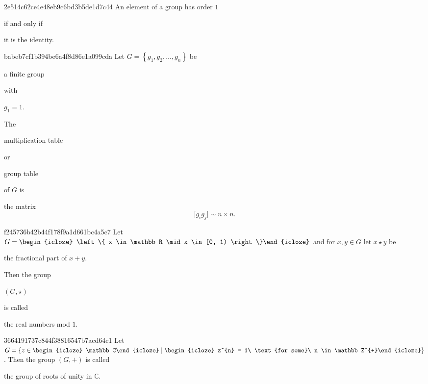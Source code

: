 \begin{note}{2e514c62ce4e48eb9c6bd3b5de1d7c44}
    An element of a group has order \({ 1 }\) \begin{icloze}{2}if and only if\end{icloze} \begin{icloze}{1}it is the identity.\end{icloze}
\end{note}

\begin{note}{babeb7cf1b394be6a4f8d86e1a099cda}
    Let \({ G = \left\{ g_1, g_2, \ldots, g_n \right\} }\) be \begin{icloze}{4}a finite group\end{icloze} with \begin{icloze}{3}\({ g_1 = 1 }\).\end{icloze}
    The \begin{icloze}{2}multiplication table\end{icloze} or \begin{icloze}{2}group table\end{icloze} of \({ G }\) is
    \begin{icloze}{1}
        the matrix
        \[
            \Big[ g_i g_j \Big] \sim n \times n.
        \]
    \end{icloze}
\end{note}

\begin{note}{f245736b42b44f178f9a1d661bc4a5c7}
    Let \({ G = \begin{icloze}{3}\left\{ x \in \mathbb R \mid x \in [0, 1) \right\}\end{icloze} }\) and for \({ x, y \in G }\) let \({ x \star y }\) be \begin{icloze}{2}the fractional part of \({ x + y }\).\end{icloze}
    Then the group \begin{icloze}{4}\({ (G, \star) }\)\end{icloze} is called \begin{icloze}{1}the real numbers mod \({ 1 }\).\end{icloze}
\end{note}

\begin{note}{3664191737c844f38816547b7acd64c1}
    Let \({ G = \left\{ z \in \begin{icloze}{3}\mathbb C\end{icloze} \mid \begin{icloze}{2}z^{n} = 1\ \text{for some}\ n \in \mathbb Z^{+}\end{icloze} \right\} }\).
    Then the group \({ (G, +) }\) is called \begin{icloze}{1}the group of roots of unity in \({ \mathbb C }\).\end{icloze}
\end{note}

